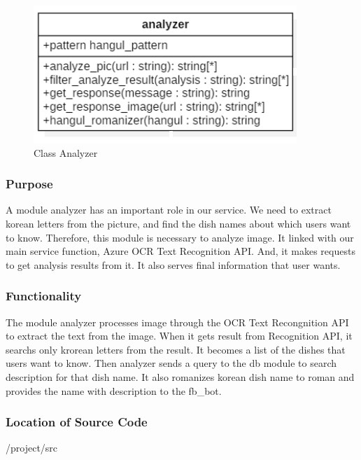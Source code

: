 \begin{figure}[htbp]
\centerline{\includegraphics[width=\linewidth]{./pictures/class_analyzer}}
\caption{Class Analyzer}
\label{fig:class_analyzer}
\end{figure}
\FloatBarrier

\subsubsection {Purpose}

A module analyzer has an important role in our service. We need to extract korean letters from the picture, and find the dish names about which users want to know. Therefore, this module is necessary to analyze image. It linked with our main service function, Azure OCR Text Recognition API. And, it makes requests to get analysis results from it. It also serves final information that user wants. \newline

\subsubsection {Functionality}

The module analyzer processes image through the OCR Text Recongnition API to extract the text from the image. When it gets result from Recognition API, it searchs only krorean letters from the result. It becomes a list of the dishes that users want to know. Then analyzer sends a query to the db module to search description for that dish name. It also romanizes korean dish name to roman and provides the name with description to the fb\_bot. \newline

\subsubsection {Location of Source Code}
/project/src \newline


